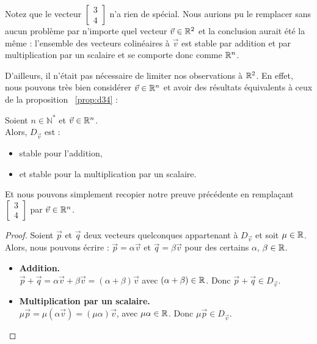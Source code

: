 Notez que le vecteur $\begin{bmatrix} 3\\4\end{bmatrix}$ n'a rien de spécial. Nous aurions pu le remplacer sans aucun problème par n'importe quel vecteur $\vec{v} \in \mathbb{R}^2$ et la conclusion aurait été la même : l'ensemble des vecteurs colinéaires à $\vec{v}$ est stable par addition et par multiplication par un scalaire et se comporte donc comme $\mathbb{R}^n$.

D'ailleurs, il n'était pas nécessaire de limiter nos observations à $\mathbb{R}^2$. En effet, nous pouvons très bien considérer $\vec{v} \in \mathbb{R}^n$ et avoir des résultats équivalents à ceux de la proposition ~\ref{prop:d34} :

\begin{boxthm} \label{thm:stab_droites}
Soient $n \in \mathbb{N}^*$ et $\vec{v} \in \mathbb{R}^n$.\\
Alors, $D_{\vec{v}}$ est :
\begin{itemize}
    \item stable pour l'addition,
    \item et stable pour la multiplication par un scalaire.
\end{itemize}
\end{boxthm}

Et nous pouvons simplement recopier notre preuve précédente en remplaçant $\begin{bmatrix} 3\\4\end{bmatrix}$ par $\vec{v} \in \mathbb{R}^n$.

\begin{proof}
    Soient $\vec{p}$ et $\vec{q}$ deux vecteurs quelconques appartenant à $D_{\vec{v}}$ et soit $\mu \in \mathbb{R}$. Alors, nous pouvons écrire : $\vec{p} = \alpha \vec{v}$ et $\vec{q} = \beta \vec{v}$ pour des certains $\alpha$, $\beta \in \mathbb{R}$.
    \begin{itemize}
        \item \textbf{Addition.}\\$\vec{p} + \vec{q} = \alpha \vec{v} + \beta \vec{v} = (\alpha + \beta) \vec{v}$ avec $(\alpha + \beta) \in \mathbb{R}$. Donc $\vec{p} + \vec{q} \in D_{\vec{v}}$.
        \item \textbf{Multiplication par un scalaire.}\\$\mu \vec{p} = \mu (\alpha \vec{v}) = (\mu \alpha) \vec{v}$, avec $\mu\alpha \in \mathbb{R}$. Donc $\mu \vec{p} \in D_{\vec{v}}$.
    \end{itemize}
\end{proof}

